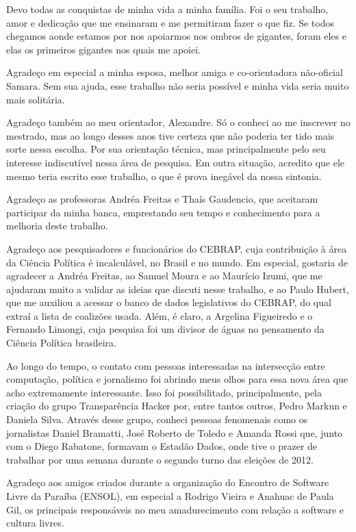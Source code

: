 Devo todas as conquistas de minha vida a minha família. Foi o seu
trabalho, amor e dedicação que me ensinaram e me permitiram fazer o que fiz. Se
todos chegamos aonde estamos por nos apoiarmos nos ombros de gigantes, foram
eles e elas os primeiros gigantes nos quais me apoiei.

Agradeço em especial a minha esposa, melhor amiga e co-orientadora não-oficial
Samara. Sem sua ajuda, esse trabalho não seria possível e minha vida seria
muito mais solitária.

Agradeço também ao meu orientador, Alexandre. Só o conheci ao me inscrever no
mestrado, mas ao longo desses anos tive certeza que não poderia ter tido mais
sorte nessa escolha. Por sua orientação técnica, mas principalmente pelo seu
interesse indiscutível nessa área de pesquisa. Em outra situação, acredito que
ele mesmo teria escrito esse trabalho, o que é prova inegável da nossa
sintonia.

Agradeço as professoras Andréa Freitas e Thaís Gaudencio, que aceitaram
participar da minha banca, emprestando seu tempo e conhecimento para a melhoria
deste trabalho.

Agradeço aos pesquisadores e funcionários do \gls{CEBRAP}, cuja contribuição à
área da Ciência Política é incalculável, no Brasil e no mundo. Em especial,
gostaria de agradecer a Andréa Freitas, ao Samuel Moura e ao Maurício Izumi, que 
me ajudaram muito a validar as ideias que discuti nesse trabalho, e ao Paulo
Hubert, que me auxiliou a acessar o banco de dados legislativos do
\gls{CEBRAP}, do qual extraí a lista de coalizões usada. Além, é claro, a
Argelina Figueiredo e o Fernando Limongi, cuja pesquisa foi um divisor de águas
no pensamento da Ciência Política brasileira.

Ao longo do tempo, o contato com pessoas interessadas na intersecção entre
computação, política e jornalismo foi abrindo meus olhos para essa nova área
que acho extremamente interessante. Isso foi possibilitado, principalmente,
pela criação do grupo Transparência Hacker por, entre tantos outros, Pedro
Markun e Daniela Silva. Através desse grupo, conheci pessoas fenomenais como os
jornalistas Daniel Bramatti, José Roberto de Toledo e Amanda Rossi que, junto
com o Diego Rabatone, formavam o Estadão Dados, onde tive o prazer de trabalhar
por uma semana durante o segundo turno das eleições de 2012.

Agradeço aos amigos criados durante a organização do Encontro de Software Livre
da Paraíba (ENSOL), em especial a Rodrigo Vieira e Anahuac de Paula Gil, os
principais responsáveis no meu amadurecimento com relação a software e cultura
livres.

